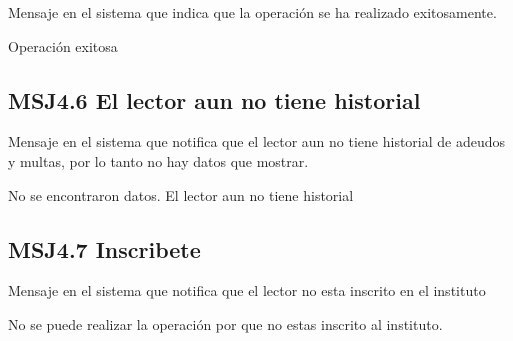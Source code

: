 Mensaje en el sistema que indica que la operación se ha realizado exitosamente.

  \noindent Operación exitosa
  
      \subsection{MSJ4.6 El lector aun no tiene historial }

Mensaje en el sistema que notifica que el lector aun no tiene historial de adeudos y multas, por lo tanto no hay datos que mostrar.

  \noindent No se encontraron datos. El lector aun no tiene historial
  
  \subsection{MSJ4.7 Inscribete}

Mensaje en el sistema que notifica que el lector no esta inscrito en el instituto

  \noindent No se puede realizar la operación por que no estas inscrito al instituto.




